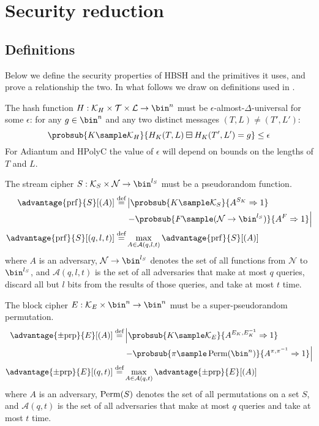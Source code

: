 \documentclass[eprint.tex]{subfiles}
\begin{document}
\section{Security reduction}
\subsection{Definitions}
Below we define the security properties of HBSH and
the primitives it uses, and prove a relationship the two.
In what follows we draw on definitions used in \cite{hctr2}.

The hash function
$H: \mathcal{K}_H \times \mathcal{T} \times \mathcal{L} \rightarrow \bin^n$
must be $\epsilon$-almost-$\Delta$-universal\label{eadudef} for some $\epsilon$:
for any $g \in \bin^n$ and
any two distinct messages $(T, L) \neq (T', L')$:
%
\begin{displaymath}
\probsub{K \sample \mathcal{K}_H}{H_{K}(T, L) \boxminus H_{K}(T', L') = g} \leq \epsilon
\end{displaymath}
%
For Adiantum and HPolyC the value of $\epsilon$ will depend on bounds on the lengths of $T$ and $L$.

The stream cipher
$S: \mathcal{K}_S \times \mathcal{N} \rightarrow \bin^{l_S}$
must be a pseudorandom function.
%
\begin{align*}
    \advantage{\mathrm{prf}}{S}[(A)] \defeq
    &\left| \probsub{K \sample \mathcal{K}_S}{A^{S_{K}}\Rightarrow 1}\right.
    \\
    &\left. - \probsub{F \sample (\mathcal{N} \rightarrow \bin^{l_S})}
    {A^F\Rightarrow 1} \right|
    \\
    \advantage{\mathrm{prf}}{S}[(q, l, t)]
    \defeq &\max_{A \in \mathcal{A}(q, l, t)} \advantage{\mathrm{prf}}{S}[(A)]
\end{align*}
%
where $A$ is an adversary,
$\mathcal{N} \rightarrow \bin^{l_S}$ denotes the set of all
functions from $\mathcal{N}$ to $\bin^{l_S}$,
and
$\mathcal{A}(q, l, t)$
is the set of all adversaries that make at most $q$ queries, discard all but $l$ bits from
the results of those queries, and take at most $t$ time.

The block cipher
$E: \mathcal{K}_E \times \bin^n \rightarrow \bin^n$
must be a super-pseudorandom permutation.
%
\begin{align*}
    \advantage{\pm \mathrm{prp}}{E}[(A)] \defeq
    &\left|\probsub{K \sample \mathcal{K}_E}{A^{E_K,E_K^{-1}}\Rightarrow 1}\right.
    \\
    &\left. - \probsub{\pi \sample \Perm(\bin^n)}{A^{\pi,\pi^{-1}}\Rightarrow 1}\right|
    \\
    \advantage{\pm \mathrm{prp}}{E}[(q, t)] \defeq
    &\max_{A \in \mathcal{A}(q, t)} \advantage{\pm \mathrm{prp}}{E}[(A)]
\end{align*}
%
where $A$ is an adversary,
$\operatorname{Perm}(S)$ denotes the set of all permutations on a set $S$,
and
$\mathcal{A}(q, t)$
is the set of all adversaries that make at most $q$ queries and take at most $t$ time.
\end{document}
